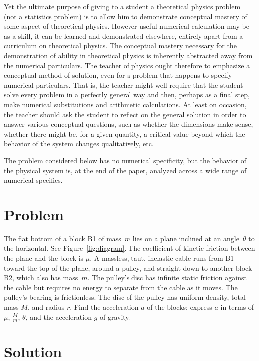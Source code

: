 \documentclass[twocolumn]{article}
\begin{document}
Yet the ultimate purpose of giving to a student a theoretical physics problem
(not a statistics problem) is to allow him to demonstrate conceptual mastery of
some aspect of theoretical physics.  However useful numerical calculation may
be as a skill, it can be learned and demonstrated elsewhere, entirely apart
from a curriculum on theoretical physics.  The conceptual mastery necessary for
the demonstration of ability in theoretical physics is inherently abstracted
away from the numerical particulars.  The teacher of physics ought therefore to
emphasize a conceptual method of solution, even for a problem that happens to
specify numerical particulars.  That is, the teacher might well require that
the student solve every problem in a perfectly general way and then, perhaps as
a final step, make numerical substitutions and arithmetic calculations. At
least on occasion, the teacher should ask the student to reflect on the general
solution in order to answer various conceptual questions, such as whether the
dimensions make sense, whether there might be, for a given quantity, a critical
value beyond which the behavior of the system changes qualitatively, etc.

The problem considered below has no numerical specificity, but the behavior of
the physical system is, at the end of the paper, analyzed across a wide range
of numerical specifics.

\section{Problem}

The flat bottom of a block B1 of mass~$m$ lies on a plane inclined at an
angle~$\theta$ to the horizontal. See Figure~\ref{fig:diagram}. The coefficient
of kinetic friction between the plane and the block is $\mu$.  A massless,
taut, inelastic cable runs from B1 toward the top of the plane, around a
pulley, and straight down to another block B2, which also has mass~$m$.  The
pulley's disc has infinite static friction against the cable but requires no
energy to separate from the cable as it moves. The pulley's bearing is
frictionless. The disc of the pulley has uniform density, total mass $M$, and
radius $r$. Find the acceleration $a$ of the blocks; express $a$ in terms of
$\mu$, $\tfrac{M}{m}$, $\theta$, and the acceleration $g$ of gravity.

\section{Solution}
\end{document}

